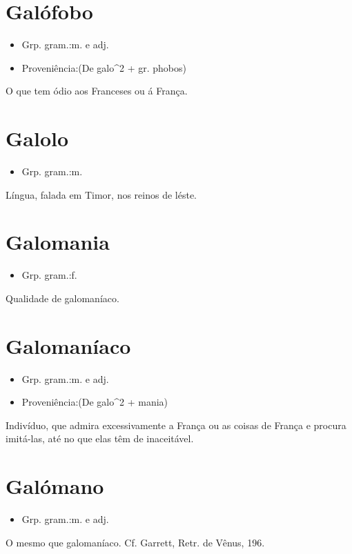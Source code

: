 \section{Galófobo}
\begin{itemize}
\item {Grp. gram.:m.  e  adj.}
\end{itemize}
\begin{itemize}
\item {Proveniência:(De \textunderscore galo\textunderscore ^2 + gr. \textunderscore phobos\textunderscore )}
\end{itemize}
O que tem ódio aos Franceses ou á França.
\section{Galolo}
\begin{itemize}
\item {Grp. gram.:m.}
\end{itemize}
Língua, falada em Timor, nos reinos de léste.
\section{Galomania}
\begin{itemize}
\item {Grp. gram.:f.}
\end{itemize}
Qualidade de galomaníaco.
\section{Galomaníaco}
\begin{itemize}
\item {Grp. gram.:m.  e  adj.}
\end{itemize}
\begin{itemize}
\item {Proveniência:(De \textunderscore galo\textunderscore ^2 + \textunderscore mania\textunderscore )}
\end{itemize}
Indivíduo, que admira excessivamente a França ou as coisas de França e procura imitá-las, até no que elas têm de inaceitável.
\section{Galómano}
\begin{itemize}
\item {Grp. gram.:m.  e  adj.}
\end{itemize}
O mesmo que \textunderscore galomaníaco\textunderscore . Cf. Garrett, \textunderscore Retr. de Vênus\textunderscore , 196.
